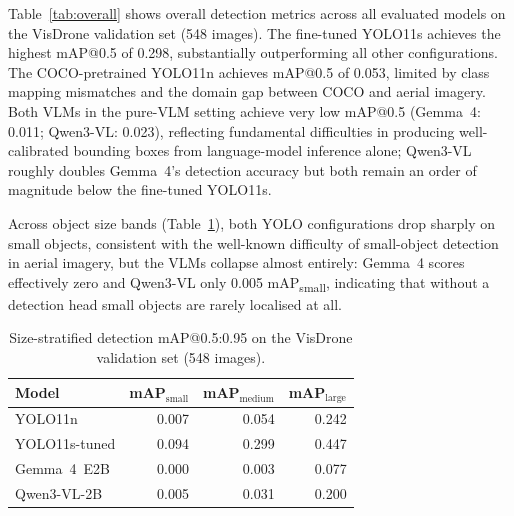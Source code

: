 \documentclass[acmtog, authorversion]{acmart}
\begin{document}
Table~\ref{tab:overall} shows overall detection metrics across all
evaluated models on the VisDrone validation set (548 images).
The fine-tuned YOLO11s achieves the highest mAP@0.5 of 0.298,
substantially outperforming all other configurations. The
COCO-pretrained YOLO11n achieves mAP@0.5 of 0.053, limited by
class mapping mismatches and the domain gap between COCO and
aerial imagery. Both VLMs in the pure-VLM setting achieve very
low mAP@0.5 (Gemma~4: 0.011; Qwen3-VL: 0.023), reflecting
fundamental difficulties in producing well-calibrated bounding
boxes from language-model inference alone; Qwen3-VL roughly doubles
Gemma~4's detection accuracy but both remain an order of magnitude
below the fine-tuned YOLO11s.

\begin{table}[H]
\caption{Overall detection metrics on VisDrone validation set (548 images).
  R = Recall@0.5. Precision@0.5 is omitted: under the COCO definition it is the
  area under the precision--recall curve, which equals AP@0.5 (the mAP@.5
  column), so it carries no additional information. The hybrid setting is
  omitted: detection is performed by YOLO11s, so its metrics are identical to
  the YOLO11s row.}
\label{tab:overall}
\end{table}

Across object size bands (Table~\ref{tab:size}), both YOLO
configurations drop sharply on small objects, consistent with the
well-known difficulty of small-object detection in aerial imagery, but
the VLMs collapse almost entirely: Gemma~4 scores effectively zero and
Qwen3-VL only 0.005 mAP\textsubscript{small}, indicating that without a
detection head small objects are rarely localised at all.

\begin{table}[H]
\caption{Size-stratified detection mAP@0.5:0.95 on the VisDrone
  validation set (548 images).}
\label{tab:size}
\begin{tabular}{lrrr}
\toprule
Model & mAP$_{\text{small}}$ & mAP$_{\text{medium}}$ & mAP$_{\text{large}}$ \\
\midrule
YOLO11n & 0.007 & 0.054 & 0.242 \\
YOLO11s-tuned & 0.094 & 0.299 & 0.447 \\
Gemma~4~E2B & 0.000 & 0.003 & 0.077 \\
Qwen3-VL-2B & 0.005 & 0.031 & 0.200 \\
\bottomrule
\end{tabular}
\end{table}
\end{document}
